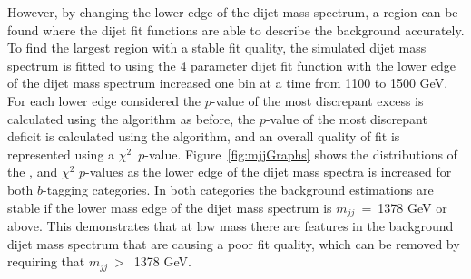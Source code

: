 However, by changing the lower edge of the dijet mass spectrum,
a region can be found where the dijet fit functions are able to describe the background accurately.
To find the largest region with a stable fit quality, the simulated dijet mass spectrum is
fitted to using the 4 parameter dijet fit function with the lower edge of the dijet mass spectrum increased one bin at a time from 1100 to 1500 GeV.
For each lower edge considered
the \mbox{$p$-value} of the most discrepant excess is calculated using the \bh{} algorithm as before,
the \mbox{$p$-value} of the most discrepant deficit is calculated using the \dhunt{} algorithm,
and an overall quality of fit is represented using a $\chi^{2}$~\mbox{$p$-value}.
Figure~\ref{fig:mjjGraphs} shows the distributions of the
\bh{}, \dhunt{} and $\chi^{2}$ \mbox{$p$-value}s as the lower edge of the dijet mass spectra is increased
for both $b$-tagging categories.
In both categories the background estimations are stable if the lower mass edge of the dijet mass spectrum is $m_{jj}$~=~1378 GeV or above.
This demonstrates that at low mass there are features in the background dijet mass spectrum that are causing a poor fit quality,
which can be removed by requiring that $m_{jj}~>$~1378 GeV. 

